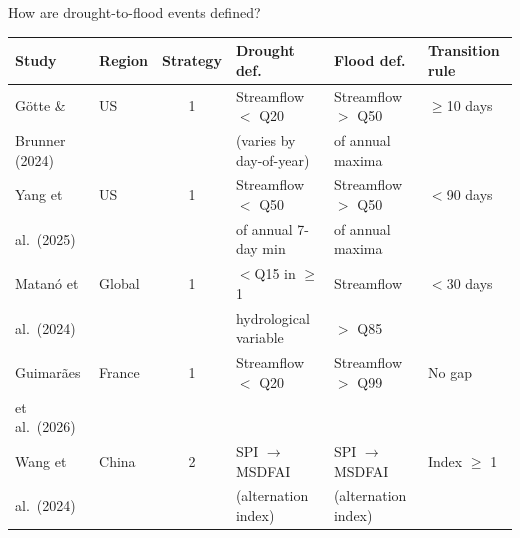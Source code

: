 \documentclass[aspectratio=169]{beamer}
\begin{document}
\begin{frame}{How are drought-to-flood events defined?}

    \centering
    \vspace{-0.5em}

    \scriptsize
    \renewcommand{\arraystretch}{1.25}
    \begin{tabular}{l l c l l l}
    \toprule
    \textbf{Study} & \textbf{Region} & \textbf{Strategy} & \textbf{Drought def.} & \textbf{Flood def.} & \textbf{Transition rule} \\
    \midrule
    G\"otte \&      & US      & 1 & Streamflow $<$ Q20       & Streamflow $>$ Q50       & $\geq$10 days \\
    Brunner (2024)  &         &   & (varies by day-of-year)  & of annual maxima         & \\
    \arrayrulecolor{gray!30}\midrule\arrayrulecolor{black}
    Yang et         & US      & 1 & Streamflow $<$ Q50       & Streamflow $>$ Q50       & $<$90 days \\
    al.\ (2025)     &         &   & of annual 7-day min      & of annual maxima         & \\
    \arrayrulecolor{gray!30}\midrule\arrayrulecolor{black}
    Matan\'o et     & Global  & 1 & $<$Q15 in $\geq$1        & Streamflow               & $<$30 days \\
    al.\ (2024)     &         &   & hydrological variable    & $>$ Q85                  & \\
    \arrayrulecolor{gray!30}\midrule\arrayrulecolor{black}
    Guimar\~aes     & France  & 1 & Streamflow $<$ Q20       & Streamflow $>$ Q99       & No gap \\
    et al.\ (2026)  &         &   &                          &                          & \\
    \arrayrulecolor{gray!30}\midrule\arrayrulecolor{black}
    Wang et         & China   & 2 & SPI $\to$ MSDFAI         & SPI $\to$ MSDFAI         & Index $\geq$ 1 \\
    al.\ (2024)     &         &   & (alternation index)      & (alternation index)      & \\
    \bottomrule
    \end{tabular}

    \vspace{0.8em}

\end{frame}
\end{document}
